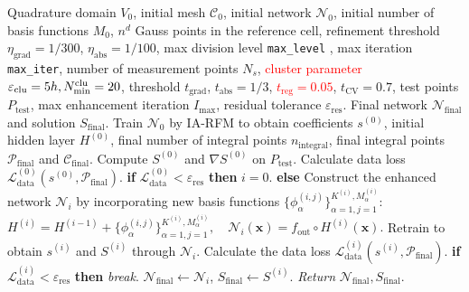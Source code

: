 \documentclass{article}
\newcommand{\red}[1]{\textcolor{red}{#1}}
\theoremstyle{plain}
\theoremstyle{definition}
\begin{document}
{\begin{algorithm}[htbp]
\caption{Morphology-Adaptive Random Feature Method (MA-RFM)}
\label{alg: two_phase}
\begin{algorithmic}[1]
\REQUIRE Quadrature domain $V_0$, initial mesh $\mathcal{C}_0$, initial network $\mathcal{N}_0$, initial number of basis functions $M_0$, $n^d$ Gauss points in the reference cell,  refinement threshold $\eta_{\text{grad}}=1/300$, $\eta_{\text{abs}}=1/100$, max division level {\tt max\_level} , max iteration {\tt max\_iter},  number of measurement points $N_s$,  \red{cluster parameter $\varepsilon_{\rm clu}=5h, N_{\min}^{\rm clu}=20$}, threshold  $t_{\text{grad}}$, $t_{\text{abs}}=1/3$, \red{$t_{\text{reg}}=0.05$}, $t_{\text{CV}} = 0.7$, test points $P_{\text{test}}$, 
max enhancement iteration $I_{\text{max}}$, 
residual tolerance $\varepsilon_{\text{res}}$.
\ENSURE Final network $\mathcal{N}_{\text{final}}$ and solution $S_{\text{final}}$.
\STATE Train $\mathcal{N}_0$ by IA-RFM to obtain coefficients $s^{(0)}$, initial hidden layer $H^{(0)}$, final number of integral points $n_{\text{integral}}$, final integral points $\mathcal{P}_{\text{final}}$ and $\mathcal{C}_{\text{final}}$. Compute $S^{(0)}$ and $\nabla S^{(0)}$ on $P_{\text{test}}$. Calculate data loss $\mathcal{L}^{(0)}_{\text{data}}(s^{(0)}, \mathcal{P}_{\text{final}})$.
\STATE \textbf{if} $\mathcal{L}_{\text{data}}^{(0)} < \varepsilon_{\text{res}}$ \textbf{then} $i=0$. \textbf{else}
\vspace{0.6em}
\STATE Construct the enhanced network $\mathcal{N}_{i}$ by incorporating new basis functions $\{\phi_\alpha^{(i,j)}\}_{\alpha=1, j=1}^{K^{(i)}, M_\alpha^{(i)}}$: 
\hspace*{\fill}%
$H^{(i)} = H^{(i-1)}+
\{\phi_\alpha^{(i,j)}\}_{\alpha=1, j=1}^{K^{(i)}, M_\alpha^{(i)}}
, \quad \mathcal{N}_{i}(\boldsymbol{x}) =  {f_{\text{out}} \circ H^{(i)}(\boldsymbol{x})}.$
\hspace*{\fill}%
\vspace{0.6em}
\STATE Retrain to obtain ${s}^{(i)}$ and ${S}^{(i)}$ through $\mathcal{N}_{i}$. 
\STATE Calculate the data loss $\mathcal{L}_{\text{data}}^{(i)}(s^{(i)},  \mathcal{P}_{\text{final}})$.
\STATE \textbf{if} $\mathcal{L}_{\text{data}}^{(i)} < \varepsilon_{\text{res}}$ \textbf{then} \emph{break}.
    \ENDFOR
\STATE $\mathcal{N}_{\text{final}} \gets \mathcal{N}_{i}$,  $S_{\text{final}} \gets S^{(i)}$.
\STATE \emph{Return} $\mathcal{N}_{\text{final}},  S_{\text{final}}$.
\end{algorithmic}
\end{algorithm}

}
\end{document}
